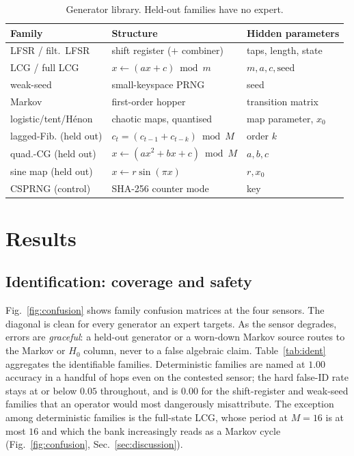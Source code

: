 \documentclass[conference]{IEEEtran}
\begin{document}
\begin{table}[t]
\centering
\caption{Generator library. Held-out families have no expert.}
\label{tab:gens}
\setlength{\tabcolsep}{4pt}
\footnotesize
\begin{tabular}{@{}lll@{}}
\toprule
Family & Structure & Hidden parameters \\
\midrule
LFSR / filt.\ LFSR & shift register ($+$ combiner) & taps, length, state \\
LCG / full LCG & $x\!\leftarrow\!(ax{+}c)\bmod m$ & $m,a,c,\text{seed}$ \\
weak-seed & small-keyspace PRNG & seed \\
Markov & first-order hopper & transition matrix \\
logistic/tent/H\'enon & chaotic maps, quantised & map parameter, $x_0$ \\
\midrule
lagged-Fib. (held out) & $c_t{=}(c_{t-1}{+}c_{t-k})\bmod M$ & order $k$ \\
quad.-CG (held out) & $x\!\leftarrow\!(ax^2{+}bx{+}c)\bmod M$ & $a,b,c$ \\
sine map (held out) & $x\!\leftarrow\!r\sin(\pi x)$ & $r,x_0$ \\
CSPRNG (control) & SHA-256 counter mode & key \\
\bottomrule
\end{tabular}
\end{table}

\section{Results}
\label{sec:results}

\subsection{Identification: coverage and safety}
Fig.~\ref{fig:confusion} shows family confusion matrices at the four sensors.
The diagonal is clean for every generator an expert targets. As the sensor
degrades, errors are \emph{graceful}: a held-out generator or a worn-down
Markov source routes to the Markov or $H_0$ column, never to a false algebraic
claim. Table~\ref{tab:ident} aggregates the identifiable families.
Deterministic families are named at $1.00$ accuracy in a handful of hops even on
the contested sensor; the hard false-ID rate stays at or below $0.05$
throughout, and is $0.00$ for the shift-register and weak-seed families that an
operator would most dangerously misattribute. The exception among
deterministic families is the full-state LCG, whose period at $M{=}16$ is at
most $16$ and which the bank increasingly reads as a Markov cycle
(Fig.~\ref{fig:confusion}, Sec.~\ref{sec:discussion}).
\end{document}
